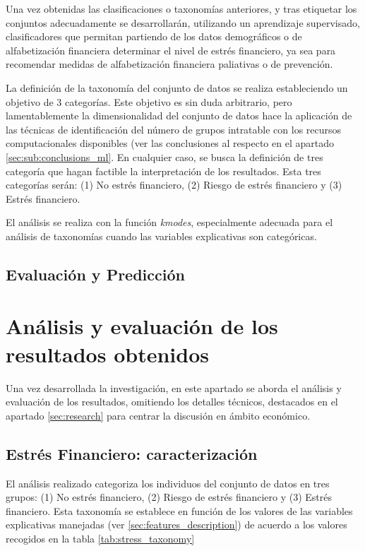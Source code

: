 \documentclass[a4paper, 11pt]{article}
\begin{document}
Una vez obtenidas las clasificaciones o taxonomías anteriores, y tras etiquetar los conjuntos
adecuadamente se desarrollarán, utilizando un aprendizaje supervisado, clasificadores que 
permitan partiendo de los datos demográficos o de alfabetización financiera determinar el 
nivel de estrés financiero, ya sea para recomendar medidas de alfabetización financiera 
paliativas o de prevención.

La definición de la taxonomía del conjunto de datos se realiza estableciendo un objetivo 
de 3 categorías. Este objetivo es sin duda arbitrario, pero lamentablemente la dimensionalidad
del conjunto de datos hace la aplicación de las técnicas de identificación del número de grupos
intratable con los recursos computacionales disponibles (ver las conclusiones al respecto en 
el apartado \ref{sec:sub:conclusions_ml}. En cualquier caso, se busca la definición de tres
categoría que hagan factible la interpretación de los resultados. Esta tres categorías serán:
(1) No estrés financiero, (2) Riesgo de estrés financiero y (3) Estrés financiero.

El análisis se realiza con la función \textit{kmodes}, especialmente adecuada para el análisis
de taxonomías cuando las variables explicativas son categóricas. 

\subsection{Evaluación y Predicción}
\label{sec:sub:predictors}

\section{Análisis y evaluación de los resultados obtenidos}
\label{sec:analysis}
Una vez desarrollada la investigación, en este apartado se aborda el análisis y evaluación de
los resultados, omitiendo los detalles técnicos, destacados en el apartado \ref{sec:research}
para centrar la discusión en ámbito económico.

\subsection{Estrés Financiero: caracterización}
El análisis realizado categoriza los individuos del conjunto de datos en tres grupos:
(1) No estrés financiero, (2) Riesgo de estrés financiero y (3) Estrés financiero. Esta
taxonomía se establece en función de los valores de las variables explicativas manejadas
(ver \ref{sec:features_description}) de acuerdo a los valores recogidos en la tabla 
\ref{tab:stress_taxonomy}
\end{document}
